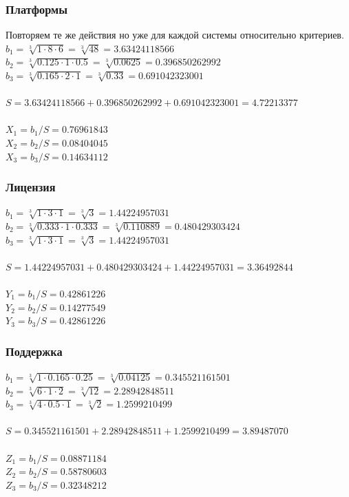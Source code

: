 \documentclass[a4paper,12pt]{report} %
\begin{document}
\subsubsection{Платформы}

Повторяем те же действия но уже для каждой системы относительно критериев.
$ b_1=\sqrt[3]{1 \cdot 8 \cdot 6} = \sqrt[3]{48} = 3.63424118566 $ \\
$ b_2=\sqrt[3]{0.125 \cdot 1 \cdot 0.5} = \sqrt[3]{0.0625} = 0.396850262992 $ \\
$ b_3=\sqrt[3]{0.165 \cdot 2 \cdot 1} = \sqrt[3]{0.33} = 0.691042323001 $ \\
\\
$ S = 3.63424118566 + 0.396850262992 + 0.691042323001 = 4.72213377 $ \\
\\
$ X_1 = b_1/S = 0.76961843 $ \\
$ X_2 = b_2/S = 0.08404045 $ \\
$ X_3 = b_3/S = 0.14634112 $ \\

\subsubsection{Лицензия}

$ b_1=\sqrt[3]{1 \cdot 3 \cdot 1} = \sqrt[3]{3} = 1.44224957031 $ \\
$ b_2=\sqrt[3]{0.333 \cdot 1 \cdot 0.333} = \sqrt[3]{0.110889} = 0.480429303424
$ \\
$ b_3=\sqrt[3]{1 \cdot 3 \cdot 1} = \sqrt[3]{3} = 1.44224957031 $ \\
\\
$ S = 1.44224957031 + 0.480429303424 + 1.44224957031 = 3.36492844 $ \\
\\
$ Y_1 = b_1/S = 0.42861226 $ \\
$ Y_2 = b_2/S = 0.14277549 $ \\
$ Y_3 = b_3/S = 0.42861226 $ \\

\subsubsection{Поддержка}
$ b_1=\sqrt[3]{1 \cdot 0.165 \cdot 0.25} = \sqrt[3]{0.04125} = 0.345521161501 $ \\
$ b_2=\sqrt[3]{6 \cdot 1 \cdot 2} = \sqrt[3]{12} = 2.28942848511 $ \\
$ b_3=\sqrt[3]{4 \cdot 0.5 \cdot 1} = \sqrt[3]{2} = 1.2599210499 $ \\
\\
$ S = 0.345521161501 + 2.28942848511 + 1.2599210499 = 3.89487070 $ \\
\\
$ Z_1 = b_1/S = 0.08871184 $ \\
$ Z_2 = b_2/S = 0.58780603 $ \\
$ Z_3 = b_3/S = 0.32348212 $ \\
\end{document}
